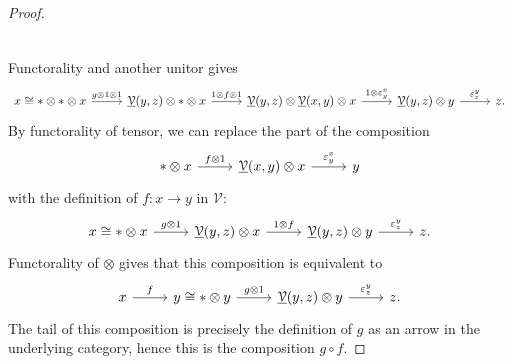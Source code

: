 \begin{proof}
\[\begin{tikzcd}[row sep = 2.5em, column sep = 2.5em]
	\end{tikzcd}\]
	Functorality and another unitor gives
	\[\begin{tikzcd}[row sep = 2.5em, column sep = 2.5em]
	x\cong *\otimes *\otimes x\ar[" g\otimes 1\otimes 1 ", r]  & \underline{\mathcal{V} } (y,z)\otimes *\otimes x\ar[" 1\otimes f\otimes 1 ", r]  & \underline{\mathcal{V} } (y,z)\otimes \underline{\mathcal{V} } (x,y)\otimes x\ar["1\otimes  \varepsilon _y^x ", r]  & \underline{\mathcal{V} } (y,z)\otimes y\ar[" \varepsilon _z^y ", r]  & z.
	\end{tikzcd}\]
	By functorality of tensor, we can replace the part of the composition
	\[\begin{tikzcd}[row sep = 2.5em, column sep = 2.5em]
	*\otimes x\ar[" f \otimes 1", r]  & \underline{\mathcal{V} } (x,y)\otimes x\ar[" \varepsilon _y^x ", r]  & y
	\end{tikzcd}\]
	with the definition of $f : x \to y$ in $\mathcal{V} $:
	\[\begin{tikzcd}[row sep = 2.5em, column sep = 2.5em]
	x\cong *\otimes x\ar[" g\otimes 1 ", r]  & \underline{\mathcal{V} } (y,z)\otimes x\ar[" 1\otimes f ", r]  & \underline{\mathcal{V} } (y,z)\otimes y\ar[" \varepsilon _z^y ", r]  & z.
	\end{tikzcd}\]
	Functorality of $\otimes $ gives that this composition is equivalent to
	\[\begin{tikzcd}[row sep = 2.5em, column sep = 2.5em]
	x\ar[" f ", r]  & y\cong *\otimes y\ar[" g\otimes 1 ", r]  & \underline{\mathcal{V} } (y,z)\otimes y\ar[" \varepsilon _z^y ", r]  & z.
	\end{tikzcd}\]
	The tail of this composition is precisely the definition of $g$ as an arrow in the underlying category, hence this is the composition $g\circ f$.
\end{proof}

